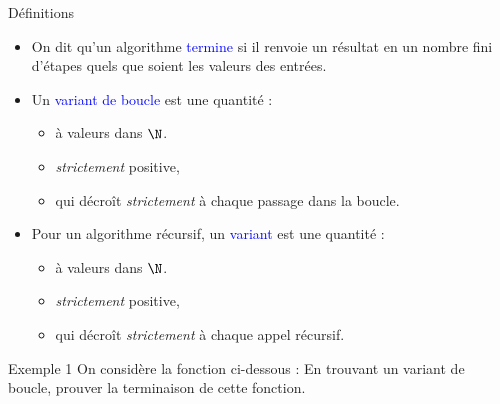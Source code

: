 \documentclass[10pt]{beamer}
\begin{document}
\begin{frame}[fragile]{\Ctitle}{\stitle}
	\begin{block}{\textcolor{gray}{\small \rappel \;} Définitions}
		\begin{itemize}
			\item<2-> On dit qu'un algorithme \textcolor{blue}{termine} si il renvoie un résultat en un nombre fini d'étapes quels que soient les valeurs des entrées.
			\item<3-> Un \textcolor{blue}{variant de boucle} est une quantité :
				\begin{itemize}
					\item<4-> à valeurs dans $\N$.
					\item<4-> \textit{strictement} positive,
					\item<5-> qui décroît \textit{strictement} à chaque passage dans la boucle.
				\end{itemize}
			\item<6-> Pour un algorithme récursif, un \textcolor{blue}{variant} est une quantité :
				\begin{itemize}
					\item<7-> à valeurs dans $\N$.
					\item<7-> \textit{strictement} positive,
					\item<8-> qui décroît \textit{strictement} à chaque appel récursif.
				\end{itemize}
		\end{itemize}
	\end{block}
\end{frame}

\begin{frame}[fragile]{\Ctitle}{\stitle}
	\begin{exampleblock}{Exemple 1}
		On considère la fonction ci-dessous :
		\onslide<2-> En trouvant un variant de boucle, prouver la terminaison de cette fonction.
	\end{exampleblock}
\end{frame}
\end{document}
